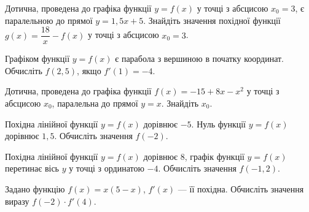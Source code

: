 \documentclass[12pt]{article}
\begin{document}
\begin{samepage}
\noindent\zadnum Дотична, проведена до графіка функції $y=f(x)$ у точці з абсцисою $x_0=3$, є паралельною до прямої $y=1{,}5x + 5$. Знайдіть значення похідної функції $g(x) = \dfrac{18}{x} - f(x)$ у точці з абсцисою $x_0=3$. 

\nmtnobreak
\nopagebreak\nbvspace{0.5cm}
\nmtAnswerBox
\par{}
\end{samepage}

\begin{samepage}
\noindent\zadnum Графіком функції $y=f(x)$ є парабола з вершиною в початку координат. Обчисліть $f(2{,}5)$, якщо $f'(1) = -4$. 

\nmtnobreak
\nopagebreak\nbvspace{0.5cm}
\nmtAnswerBox
\par{}
\end{samepage}

\begin{samepage}
\noindent\zadnum Дотична, проведена до графіка функції $f(x) = -15 + 8x - x^2$ у точці з абсцисою $x_0$, паралельна до прямої $y=x$. Знайдіть $x_0$. 

\nmtnobreak
\nopagebreak\nbvspace{0.5cm}
\nmtAnswerBox
\par{}
\end{samepage}

\begin{samepage}
\noindent\zadnum Похідна лінійної функції $y=f(x)$ дорівнює $-5$. Нуль функції $y=f(x)$ дорівнює $1{,}5$. Обчисліть значення $f(-2)$. 

\nmtnobreak
\nopagebreak\nbvspace{0.5cm}
\nmtAnswerBox
\par{}
\end{samepage}

\begin{samepage}
\noindent\zadnum Похідна лінійної функції $y=f(x)$ дорівнює $8$, графік функції $y=f(x)$ перетинає вісь $y$ у точці з ординатою $-4$. Обчисліть значення $f(-1{,}2)$. 

\nmtnobreak
\nopagebreak\nbvspace{0.5cm}
\nmtAnswerBox
\par{}
\end{samepage}

\begin{samepage}
\noindent\zadnum Задано функцію $f(x) = x(5-x)$, $f'(x)$ — її похідна. Обчисліть значення виразу $f(-2) \cdot f'(4)$. 

\nmtnobreak
\nopagebreak\nbvspace{0.5cm}
\nmtAnswerBox
\par{}
\end{samepage}
\end{document}
